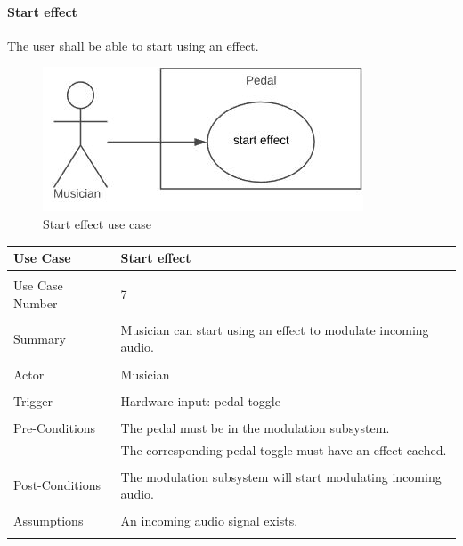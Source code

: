             \paragraph{Start effect} 
            The user shall be able to start using an effect.
            \begin{figure}[!ht]
                \centering
                \includegraphics[width=.5\textwidth]{diagrams/use_cases/uc-effect-start.JPG}
                \caption{Start effect use case}
                \label{fig:uc-start-effect}
            \end{figure}
            \begin{table}[!ht]
                \centering
                \begin{tabular}{l l}
                    Use Case & Start effect \\
                    \hline \\
                    Use Case Number & 7 \\ \\
                    Summary & Musician can start using an effect to modulate incoming audio. \\ \\
                    Actor & Musician \\ \\
                    Trigger & Hardware input: pedal toggle \\ \\
                    Pre-Conditions & The pedal must be in the modulation subsystem. \\
                    & The corresponding pedal toggle must have an effect cached. \\ \\
                    Post-Conditions & The modulation subsystem will start modulating incoming audio. \\ \\
                    Assumptions & An incoming audio signal exists.\\ \\
                \end{tabular}
            \end{table}     
            
